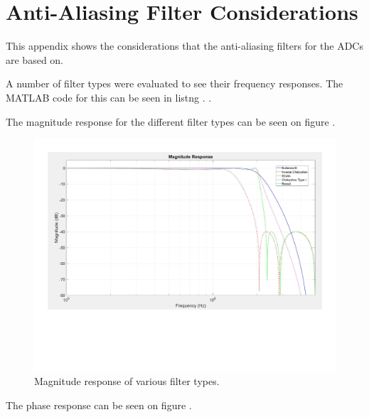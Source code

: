 \chapter{Anti-Aliasing Filter Considerations} \label{App:AntiAliasingFilterConsideration}
This appendix shows the considerations that the anti-aliasing filters for the ADCs are based on.

A number of filter types were evaluated to see their frequency responses. The MATLAB code for this can be seen in listng .
. 

The magnitude response for the different filter types can be seen on figure .

\begin{figure}[H]
    \centering
    \includegraphics[clip, trim=0 150 0 0, width=1\textwidth]{Appendix/Figures/A_FILT_MAG.pdf}
    \caption{Magnitude response of various filter types.}
    \label{fig:A_FILT_MAG}
\end{figure}

The phase response can be seen on figure .

